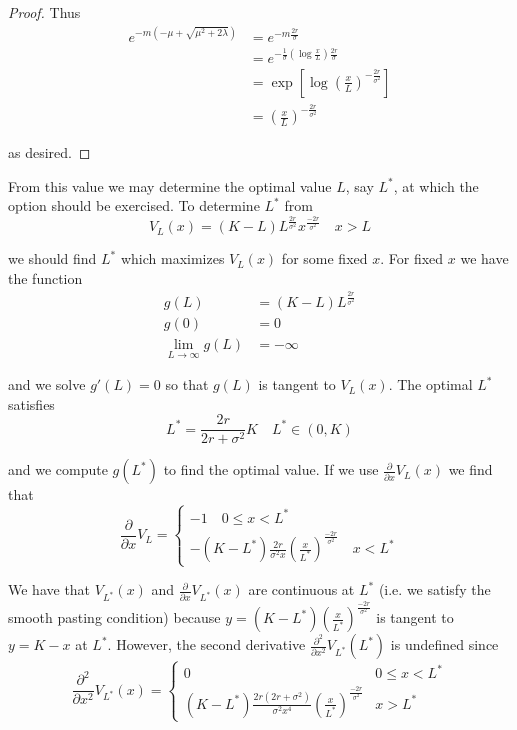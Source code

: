 \documentclass[12pt]{article}
\newlength\tindent
\renewcommand{\indent}{\hspace*{\tindent}}
\begin{document}
\begin{proof}
Thus
\begin{align*}
e^{ -m(-\mu + \sqrt{\mu^2 + 2\lambda} )} &= e^{-m \frac{2r}{\sigma} } \\
	&= e^{-\frac{1}{\sigma} \left( \log \frac{x}{L} \right) \frac{2r}{\sigma} } \\
	&= \exp \left[ \log \left( \frac{x}{L} \right)^{-\frac{2r}{\sigma^2}} \right] \\
	&= \left( \frac{x}{L} \right)^{-\frac{2r}{\sigma^2}}
\end{align*}

as desired.
\end{proof}

\indent From this value we may determine the optimal value $L$, say $L^*$, at which the option should be exercised. To determine $L^*$ from 
\begin{equation*}
	V_L(x) = (K - L) L^\frac{2r}{\sigma^2} x^\frac{-2r}{\sigma^2} \quad x > L
\end{equation*}

we should find $L^*$ which maximizes $V_L(x)$ for some fixed $x$. For fixed $x$ we have the function
\begin{align*}
	g(L) &= (K - L)L^\frac{2r}{\sigma^2} \\
	g(0) &= 0 \\
	\lim_{L \to \infty} g(L) &= -\infty
\end{align*}

and we solve $g'(L) = 0$ so that $g(L)$ is tangent to $V_L(x)$. The optimal $L^*$ satisfies
\begin{equation*}
	L^* = \frac{2r}{2r + \sigma^2}K \quad L^* \in (0, K)
\end{equation*}

and we compute $g(L^*)$ to find the optimal value. If we use $\frac{\partial}{\partial x} V_L(x)$ we find that
\begin{equation*}
	\frac{\partial}{\partial x} V_L =
	\begin{cases}
		-1 \quad 0 \leq x < L^* \\
		-(K - L^*) \frac{2r}{\sigma^2 x} \left( \frac{x}{L^*} \right)^\frac{-2r}{\sigma^2} \quad x < L^*
	\end{cases}
\end{equation*}

\indent We have that $V_{L^*}(x)$ and $\frac{\partial}{\partial x} V_{L^*}(x)$ are continuous at $L^*$ (i.e. we satisfy the smooth pasting condition) because $y = (K - L^*) \left( \frac{x}{L^*} \right)^\frac{-2r}{\sigma^2}$ is tangent to $y = K - x$ at $L^*$. However, the second derivative $\frac{\partial^2}{\partial x^2} V_{L^*}(L^*)$ is undefined since
\begin{equation*}
	\frac{\partial^2}{\partial x^2} V_{L^*}(x) = 
	\begin{cases}
		0 & 0 \leq x < L^* \\
		(K - L^*) \frac{2r(2r + \sigma^2)}{\sigma^2x^4} \left( \frac{x}{L^*} \right)^\frac{-2r}{\sigma^2} & x > L^*
	\end{cases}
\end{equation*}
\end{document}
